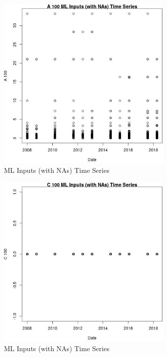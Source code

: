 \begin{figure} 
\centering  
\includegraphics[width=0.77\textwidth]{Code_Outputs/Report_ML_input_PM25_Step4_part_e_de_duplicated_aves_compiled_2019-05-18wNAs_A_100vDate.jpg} 
\caption{\label{fig:Report_ML_input_PM25_Step4_part_e_de_duplicated_aves_compiled_2019-05-18wNAsA_100vDate}ML Inputs (with NAs) Time Series} 
\end{figure} 
 

\begin{figure} 
\centering  
\includegraphics[width=0.77\textwidth]{Code_Outputs/Report_ML_input_PM25_Step4_part_e_de_duplicated_aves_compiled_2019-05-18wNAs_C_100vDate.jpg} 
\caption{\label{fig:Report_ML_input_PM25_Step4_part_e_de_duplicated_aves_compiled_2019-05-18wNAsC_100vDate}ML Inputs (with NAs) Time Series} 
\end{figure} 
 

